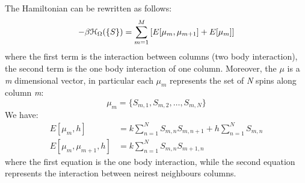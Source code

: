 \documentclass[../main/main.tex]{subfiles}
\begin{document}
The Hamiltonian can be rewritten as follows:
\begin{equation}
  -\beta \mathcal{H}_ \Omega  ( \{ S \}  ) = \sum_{m=1}^{M} \qty[E[\mu _m, \mu _{m+1}] + E[\mu _m]]
\end{equation}
where the first term is the interaction between columns (two body interaction), the second term is the one body interaction of one column. Moreover, the \( \mu  \)  is a \emph{m} dimensional vector, in particular each \( \mu _m \) represents the set of \emph{N} spins along column \emph{m}:
\begin{equation}
  \mu _m = \{ S_{m,1}, S_{m,2}, \dots, S_{m,N} \}
  \label{eq:9_1}
\end{equation}
We have:
\begin{subequations}
\begin{align}
E [ \mu _m,h] &= k \sum_{n=1}^{N} S_{m,n} S_{m,n+1} + h \sum_{n=1}^{N} S_{m,n} \\
  E [\mu _m, \mu _{m+1},h] & = k \sum_{n=1}^{N} S_{m,n} S_{m+1,n}
\end{align}
\end{subequations}
where the first equation is the one body interaction, while the second equation represents the interaction between neirest neighbours columns.
\end{document}
